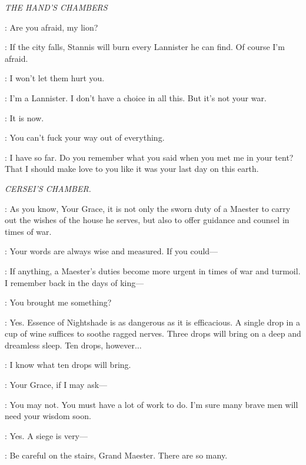 \textit{THE HAND'S CHAMBERS}


\SHAE: Are you afraid, my lion? 

\TYRION: If the city falls, Stannis will burn every Lannister he can find. Of course I'm afraid. 

\SHAE: I won't let them hurt you. 

\TYRION: I'm a Lannister. I don't have a choice in all this. But it's not your war. 

\SHAE: It is now.


\TYRION: You can't fuck your way out of everything. 

\SHAE: I have so far. Do you remember what you said when you met me in your tent? That I should make love to you like it was your last day on this
earth.



\scene

\textit{CERSEI'S CHAMBER.}


\PYCELLE: As you know, Your Grace, it is not only the sworn duty of a Maester to carry out the wishes of the house he serves, but also to offer guidance and counsel in times of war. 

\CERSEI: Your words are always wise and measured. If you could---  

\PYCELLE: If anything, a Maester's duties become more urgent in times of war and turmoil. I remember back in the days of king---  

\CERSEI: You brought me something? 

\PYCELLE: Yes.  Essence of Nightshade is as dangerous as it is efficacious. A single drop in a cup of wine suffices to soothe ragged nerves. Three drops will bring on a deep and dreamless sleep. 
Ten drops, however$\ldots$  

\CERSEI: I know what ten drops will bring. 

\PYCELLE: Your Grace, if I may ask---  

\CERSEI: You may not. You must have a lot of work to do. I'm sure many brave men will need your wisdom soon. 

\PYCELLE: Yes. A siege is very---  

\CERSEI: Be careful on the stairs, Grand Maester. There are so many. 

